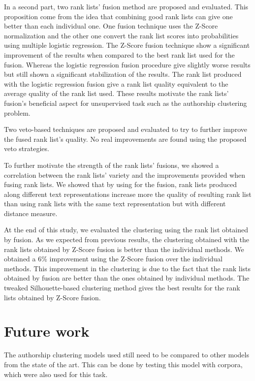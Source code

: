 In a second part, two rank lists' fusion method are proposed and evaluated.
This proposition come from the idea that combining good rank lists can give one better than each individual one.
One fusion technique uses the Z-Score normalization and the other one convert the rank list scores into probabilities using multiple logistic regression.
The Z-Score fusion technique show a significant improvement of the results when compared to the best rank list used for the fusion.
Whereas the logistic regression fusion procedure give slightly worse results but still shown a significant stabilization of the results.
The rank list produced with the logistic regression fusion give a rank list quality equivalent to the average quality of the rank list used.
These results motivate the rank lists' fusion's beneficial aspect for unsupervised task such as the authorship clustering problem.

Two veto-based techniques are proposed and evaluated to try to further improve the fused rank list's quality.
No real improvements are found using the proposed veto strategies.

To further motivate the strength of the rank lists' fusions, we showed a correlation between the rank lists' variety and the improvements provided when fusing rank lists.
We showed that by using for the fusion, rank lists produced along different text representations increase more the quality of resulting rank list than using rank lists with the same text representation but with different distance measure.

At the end of this study, we evaluated the clustering using the rank list obtained by fusion.
As we expected from previous results, the clustering obtained with the rank lists obtained by Z-Score fusion is better than the individual methods.
We obtained a 6\% improvement using the Z-Score fusion over the individual methods.
This improvement in the clustering is due to the fact that the rank lists obtained by fusion are better than the ones obtained by individual methods.
The tweaked Silhouette-based clustering method gives the best results for the rank lists obtained by Z-Score fusion.

\section{Future work}

The authorship clustering models used still need to be compared to other models from the state of the art.
This can be done by testing this model with corpora, which were also used for this task.

